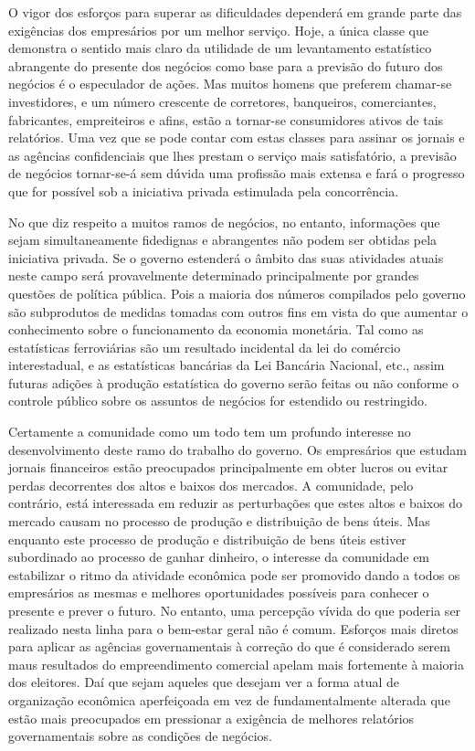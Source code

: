\documentclass[12pt]{article}
\begin{document}
O vigor dos esforços para superar as dificuldades dependerá em grande parte das exigências dos empresários por um melhor serviço. Hoje, a única classe que demonstra o sentido mais claro da utilidade de um levantamento estatístico abrangente do presente dos negócios como base para a previsão do futuro dos negócios é o especulador de ações. Mas muitos homens que preferem chamar-se investidores, e um número crescente de corretores, banqueiros, comerciantes, fabricantes, empreiteiros e afins, estão a tornar-se consumidores ativos de tais relatórios. Uma vez que se pode contar com estas classes para assinar os jornais e as agências confidenciais que lhes prestam o serviço mais satisfatório, a previsão de negócios tornar-se-á sem dúvida uma profissão mais extensa e fará o progresso que for possível sob a iniciativa privada estimulada pela concorrência.

No que diz respeito a muitos ramos de negócios, no entanto, informações que sejam simultaneamente fidedignas e abrangentes não podem ser obtidas pela iniciativa privada. Se o governo estenderá o âmbito das suas atividades atuais neste campo será provavelmente determinado principalmente por grandes questões de política pública. Pois a maioria dos números compilados pelo governo são subprodutos de medidas tomadas com outros fins em vista do que aumentar o conhecimento sobre o funcionamento da economia monetária. Tal como as estatísticas ferroviárias são um resultado incidental da lei do comércio interestadual, e as estatísticas bancárias da Lei Bancária Nacional, etc., assim futuras adições à produção estatística do governo serão feitas ou não conforme o controle público sobre os assuntos de negócios for estendido ou restringido.

Certamente a comunidade como um todo tem um profundo interesse no desenvolvimento deste ramo do trabalho do governo. Os empresários que estudam jornais financeiros estão preocupados principalmente em obter lucros ou evitar perdas decorrentes dos altos e baixos dos mercados. A comunidade, pelo contrário, está interessada em reduzir as perturbações que estes altos e baixos do mercado causam no processo de produção e distribuição de bens úteis. Mas enquanto este processo de produção e distribuição de bens úteis estiver subordinado ao processo de ganhar dinheiro, o interesse da comunidade em estabilizar o ritmo da atividade econômica pode ser promovido dando a todos os empresários as mesmas e melhores oportunidades possíveis para conhecer o presente e prever o futuro. No entanto, uma percepção vívida do que poderia ser realizado nesta linha para o bem-estar geral não é comum. Esforços mais diretos para aplicar as agências governamentais à correção do que é considerado serem maus resultados do empreendimento comercial apelam mais fortemente à maioria dos eleitores. Daí que sejam aqueles que desejam ver a forma atual de organização econômica aperfeiçoada em vez de fundamentalmente alterada que estão mais preocupados em pressionar a exigência de melhores relatórios governamentais sobre as condições de negócios.
\end{document}
